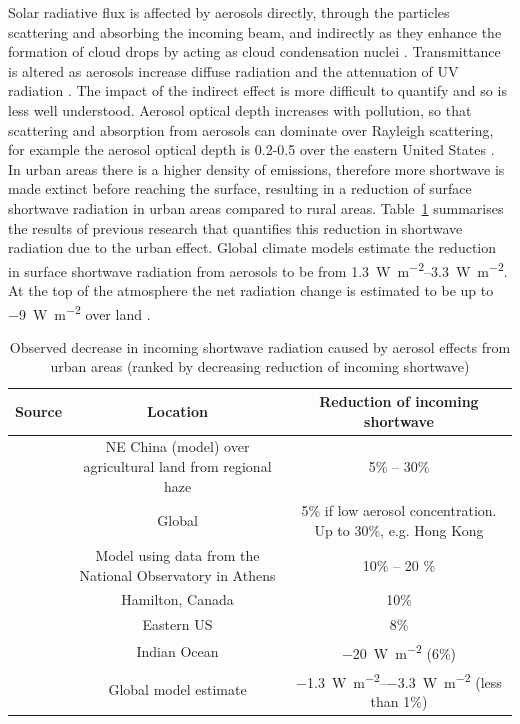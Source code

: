 \documentclass[a4paper,titlepage, twoside]{report}
\begin{document}
Solar radiative flux is affected by aerosols directly, through the particles scattering and absorbing the incoming beam, and indirectly as they enhance the formation of cloud drops by acting as cloud condensation nuclei \parencite{chameides}.  Transmittance is altered as aerosols increase diffuse radiation and the attenuation of UV radiation \parencite{cleugh}.  The impact of the indirect effect is more difficult to quantify and so is less well understood. Aerosol optical depth increases with pollution, so that scattering and absorption from aerosols can dominate over Rayleigh scattering, for example the aerosol optical depth is 0.2-0.5 over the eastern United States \parencite{chameides}.  In urban areas there is a higher density of emissions, therefore more shortwave is made extinct before reaching the surface, resulting in a reduction of surface shortwave radiation in urban areas compared to rural areas.  Table~\ref{tab:aerosol-sw} summarises the results of previous research that quantifies this reduction in shortwave radiation due to the urban effect. Global climate models estimate the reduction in surface shortwave radiation from aerosols to be from \SIrange{1.3}{3.3}{\watt\per\meter\squared}.  At the top of the atmosphere the net radiation change is estimated to be up to \SI{-9}{\watt\per\meter\squared} over land \parencite{ipcc}.

\begin{landscape}
\begin{table}
\centering
\begin{tabular}{ c c c }
\toprule
Source &	Location &	Reduction of incoming shortwave \\ \midrule
\cite{chameides} &	NE China (model) over agricultural land from regional haze & 5\% -- 30\% \\
\cite{cleugh} & 	Global &	5\% if low aerosol concentration.  Up to 30\%, e.g. Hong Kong \\
\cite{psiloglou} &	Model using data from the National Observatory in Athens & 10\% -- 20 \% \\
\cite{rouse} &		Hamilton, Canada & 10\% \\
\cite{ball} &		Eastern US & 8\% \\
\cite{ramanathan} &	Indian Ocean & \SI{-20}{\watt\per\meter\squared} (6\%) \\
\cite{ipcc} &		Global model estimate & \SIrange{-1.3}{-3.3}{\watt\per\meter\squared} (less than 1\%) \\ \bottomrule
\end{tabular}
\caption{Observed decrease in incoming shortwave radiation caused by aerosol effects from urban areas (ranked by decreasing reduction of incoming shortwave)}
\label{tab:aerosol-sw}
\end{table}
\end{landscape}
\end{document}
